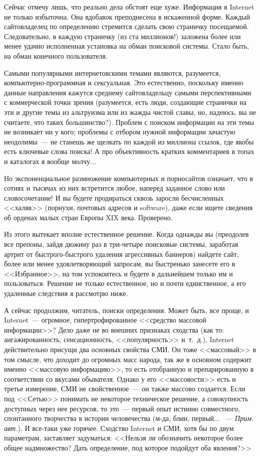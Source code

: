 \documentclass{scrbook}
\newcommand{\flqq}{<<}
\newcommand{\frqq}{>>}
\newcommand{\mdash}{~--- }
\newcommand{\mycomment}[1]{{\mdash} \textit{#1}}
\begin{document}
Сейчас отмечу лишь, что реально дела обстоят еще хуже. Информация в Internet не только избыточна. Она вдобавок преподнесена в искаженной форме. Каждый сайтовладелец по определению стремится сделать свою страничку посещаемой. Следовательно, в каждую страничку (из ста миллионов!) заложена более или менее удачно исполненная установка на обман поисковой системы. Стало быть, на обман конечного пользователя.

Самыми популярными интернетовскими темами являются, разумеется, компьютерно-программная и сексуальная. Это естественно, поскольку именно данные направления кажутся среднему сайтовладельцу самыми перспективными с коммерческой точки зрения (разумеется, есть люди, создающие странички на эти и другие темы из альтруизма или из жажды чистой славы, но, надеюсь, вы не считаете, что таких большинство?). Проблем с поиском информации на эти темы не возникает ни у кого; проблемы с отбором нужной информации зачастую неодолимы{\mdash}не станешь же щелкать по каждой из миллиона ссылок, где якобы есть ключевые слова поиска! А про объективность кратких комментариев в топах и каталогах я вообще молчу...

Но экспоненциальное размножение компьютерных и порносайтов означает, что в сотнях и тысячах из них встретится любое, наперед заданное слово или словосочетание! И вы будете продираться сквозь заросли бесчисленных {\flqq}халяв{\frqq} (порнухи, почтовых адресов и software), даже если ищете сведения об орденах малых стран Европы XIX века. Проверено.

Из этого вытекает вполне естественное решение. Когда однажды вы (преодолев все препоны, зайдя дюжину раз в три-четыре поисковые системы, заработав артрит от быстрого-быстрого удаления агрессивных баннеров) найдете сайт, более или менее удовлетворяющий запросам, вы быстренько занесете его в {\flqq}Избранное{\frqq}, на том успокоитесь и будете в дальнейшем только им и пользоваться. Решение не только естественное, но и почти единственное, а его удаленные следствия я рассмотрю ниже.

А сейчас продолжим, читатель, поиски определения. Может быть, все проще, и Internet{\mdash}огромное, гипертрофированное {\flqq}средство массовой информации{\frqq}? Дело даже не во внешних признаках сходства (как то: ангажированность, сенсационность, {\flqq}популярность{\frqq} и~т.~д.), Internet действительно присущи два основных свойства СМИ. Он тоже {\flqq}массовый{\frqq} в том смысле, что доходит до огромных масс народа, так же в основном содержит именно {\flqq}массовую информацию{\frqq}, то есть отобранную и препарированную в соответствии со вкусами обывателя. Однако у его {\flqq}массовости{\frqq} есть и третье измерение, СМИ не свойственное{\mdash}он также массово создается. Если под {\flqq}Сетью{\frqq} понимать не некоторое техническое решение, а совокупность доступных через нее ресурсов, то это{\mdash}первый опыт истинно совместного, спонтанного творчества в истории человечества (м-да, блин, первый... \mycomment{Прим. авт.}). И все-таки уже горячее. Сходство Internet и СМИ, хотя бы по двум параметрам, заставляет задуматься: {\flqq}Нельзя ли обозначить некоторое более общее надмножество? Дать определение, под которое подойдут оба явления?{\frqq}
\end{document}
